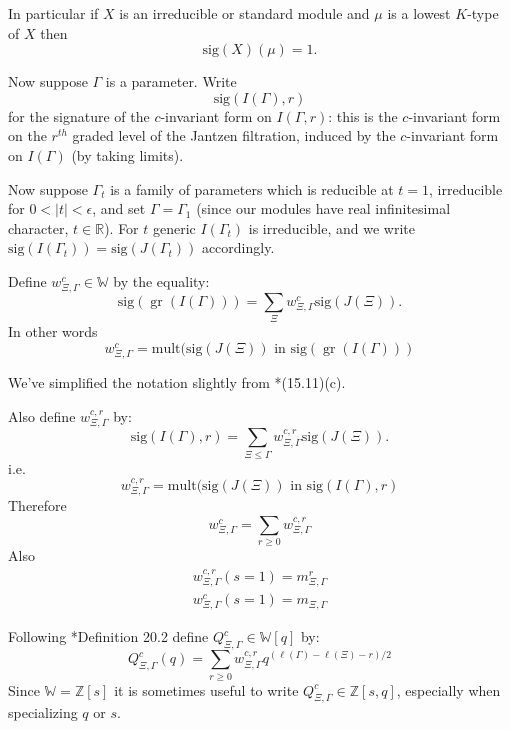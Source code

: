 \documentclass[12pt,leqno]{article}
\newcommand{\sig}{\text{sig}}
\DeclareMathOperator{\gr}{\text{gr}}
\newcommand{\mult}{\text{mult}}
\newcommand{\R}{\mathbb R}
\newcommand{\Z}{\mathbb Z}
\newcommand{\W}{\mathbb W}
\begin{document}
In particular if $X$ is an irreducible or standard module and $\mu$ is a lowest $K$-type
of $X$ then
\begin{equation}
\label{e:siglowest}
\sig(X)(\mu)=1.
\end{equation}


Now suppose $\Gamma$ is a parameter.
Write
$$
\sig(I(\Gamma),r)
$$
for the signature of the $c$-invariant form on $I(\Gamma,r)$: this is
the $c$-invariant form on the $r^{th}$ graded  level of the Jantzen
filtration, induced by the $c$-invariant form on $I(\Gamma)$ (by taking limits).

Now suppose $\Gamma_t$ is a family of parameters which is reducible at
$t=1$, irreducible for $0<|t|<\epsilon$, and set $\Gamma=\Gamma_1$
(since our modules have real infinitesimal character, $t\in\R$).
For $t$ generic $I(\Gamma_t)$ is irreducible, and we write
$\sig(I(\Gamma_t))=\sig(J(\Gamma_t))$ accordingly.

Define  $w_{\Xi,\Gamma}^c\in \W$ by the equality:
\begin{equation}
\label{e:w}
\sig(\gr(I(\Gamma)))=\sum_{\Xi}w^c_{\Xi,\Gamma}\sig(J(\Xi)).
\end{equation}
In other words
$$
w^c_{\Xi,\Gamma}=\mult(\sig(J(\Xi))\text{ in }\sig(\gr(I(\Gamma)))
$$


We've simplified the notation slightly from \cite{unitaryDual}*{(15.11)(c)}.

Also define $w_{\Xi,\Gamma}^{c,r}$ by:
$$
\sig(I(\Gamma),r)=\sum_{\Xi\le\Gamma} w_{\Xi,\Gamma}^{c,r}\sig(J(\Xi)).
$$
i.e.
$$
w^{c,r}_{\Xi,\Gamma}=\mult(\sig(J(\Xi))\text{ in }\sig(I(\Gamma),r)
$$
Therefore
\begin{equation}
\label{e:w_wr}
w^c_{\Xi,\Gamma}=\sum_{r\ge 0} w_{\Xi,\Gamma}^{c,r}
\end{equation}
Also
\begin{equation}
\label{e:w1}
\begin{aligned}
w^{c,r}_{\Xi,\Gamma}(s=1)=m^r_{\Xi,\Gamma}\\
w^c_{\Xi,\Gamma}(s=1)=m_{\Xi,\Gamma}
\end{aligned}
\end{equation}







Following \cite{unitaryDual}*{Definition 20.2} define
$Q^c_{\Xi,\Gamma}\in\W[q]$ by:
\begin{equation}
\label{e:Qc}
Q^c_{\Xi,\Gamma}(q)=\sum_{r\ge 0} w^{c,r}_{\Xi,\Gamma}q^{(\ell(\Gamma)-\ell(\Xi)-r)/2}
\end{equation}
Since $\W=\Z[s]$ it is sometimes useful to write  $Q^c_{\Xi,\Gamma}\in \Z[s,q]$, especially when specializing $q$ or $s$.
\end{document}
